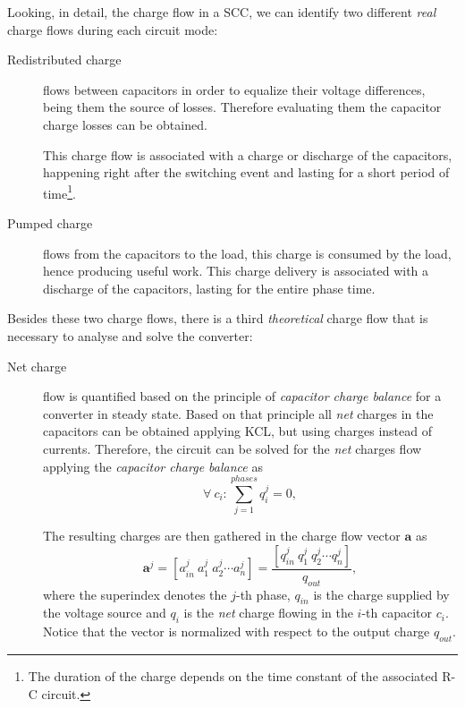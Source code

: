 Looking, in detail, the charge flow in a SCC, we can identify two different \emph{real} charge flows during each circuit mode:
\begin{description}

  \item[Redistributed charge] flows between capacitors in order to equalize their voltage differences, being them the source of losses. Therefore evaluating them the capacitor charge losses can be obtained.

      This charge flow is associated with a charge or discharge of the capacitors, happening right after the switching event and lasting for a short period of time\footnote{The duration of the charge depends on the time constant of the associated R-C circuit.}.

  \item[Pumped charge] flows from the capacitors to the load, this charge is consumed by the load, hence producing useful work.  This charge delivery is associated with a discharge of the capacitors, lasting for the entire phase time.

\end{description}

Besides these two charge flows, there is a third \emph{theoretical} charge flow that is necessary to analyse and solve the converter:
\begin{description}

  \item[Net charge] flow is quantified based on the principle of \emph{capacitor charge balance} for a converter in steady state. Based on that principle all \emph{net} charges in the capacitors can be obtained applying KCL, but using charges instead of currents. Therefore, the circuit can be solved for the \emph{net} charges flow applying the \emph{capacitor charge balance} as
      \begin{equation}
       \forall~c_{i} : \sum_{j=1}^{phases}q_{i}^j = 0,
      \label{eq:charge_balance}
      \end{equation}

     The resulting charges are then gathered in the charge flow vector $\mathbf{a}$ as
       \begin{equation}
        \mathbf{a}^j =  \left[ a_{in}^j~a_1^j~a_2^j \cdots a_n^j \right] = \frac{\left[ q_{in}^j~q_1^j~q_2^j \cdots q_n^j \right]}{q_{out}},
      \label{eq:a_vector}
      \end{equation}
    where the superindex denotes the $j$-th phase, $q_{in}$ is the charge supplied by the voltage source and $q_i$ is the \emph{net} charge flowing in the $i$-th capacitor $c_i$. Notice that the vector is normalized with respect to the output charge $q_{out}$.
\end{description}


